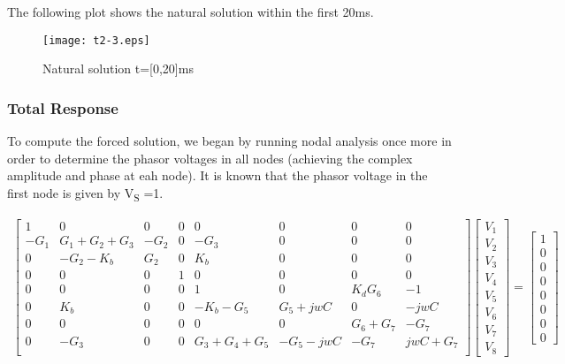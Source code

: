 The following plot shows the natural solution within the first 20ms.
\begin{figure}[h] \centering
\texttt{[image: t2-3.eps]}
\caption{Natural solution t=[0,20]ms}
\label{fig:natural}
\end{figure}

\subsubsection{Total Response}

To compute the forced solution, we began by running nodal analysis once more in order to determine the phasor voltages in all nodes (achieving the complex amplitude and phase at eah node). It is known that the phasor voltage in the first node is given by V\textsubscript S =1.

\begin{gather}
\begin{bmatrix}
1 & 0 & 0 & 0 & 0 & 0 & 0 & 0\\
-G_1 & G_1+G_2+G_3 & -G_2& 0 & -G_3 & 0 & 0 & 0\\
0 & -G_2-K_b & G_2 & 0 & K_b & 0 & 0 & 0\\
0 & 0 & 0 & 1 & 0 & 0 & 0 & 0\\
0 & 0 & 0 & 0 & 1 & 0 & K_d G_6 & -1\\
0 & K_b & 0 & 0 & -K_b-G_5 & G_5+jwC & 0 & -jwC\\
0 & 0 & 0 & 0 & 0 & 0 & G_6+G_7 & -G_7\\
0 & -G_3 & 0 & 0 & G_3+G_4+G_5 & -G_5-jwC & -G_7 & jwC+G_7\\
\end{bmatrix}
\begin{bmatrix}
 V_1\\
 V_2\\
 V_3\\
 V_4\\
 V_5\\
 V_6\\
 V_7\\
 V_8
\end{bmatrix}
=
\begin{bmatrix}
 1\\
 0\\
 0\\
 0\\
 0\\
 0\\
 0\\
 0
\end{bmatrix}
\end{gather}


